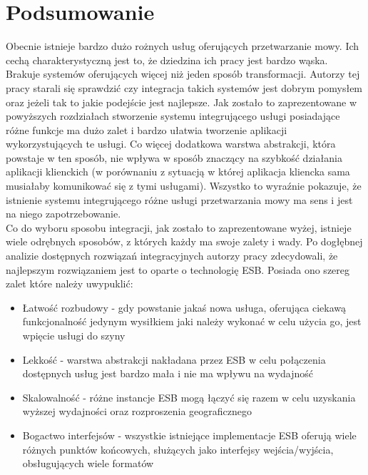 
\chapter{Podsumowanie} %



\ifpdf
    \graphicspath{{7/figures/PNG/}{7/figures/PDF/}{7/figures/}}
\else
    \graphicspath{{7/figures/EPS/}{7/figures/}}
\fi

Obecnie istnieje bardzo dużo rożnych usług oferujących przetwarzanie mowy. Ich cechą charakterystyczną jest to, że dziedzina ich pracy jest bardzo wąska. Brakuje systemów oferujących więcej niż jeden sposób transformacji. Autorzy tej pracy starali się sprawdzić czy integracja takich systemów jest dobrym pomysłem oraz jeżeli tak to jakie podejście jest najlepsze. Jak zostało to zaprezentowane w powyższych rozdziałach stworzenie systemu integrującego usługi posiadające różne funkcje ma dużo zalet i bardzo ułatwia tworzenie aplikacji wykorzystujących te usługi. Co więcej dodatkowa warstwa abstrakcji, która powstaje w ten sposób, nie wpływa w sposób znaczący na szybkość działania aplikacji klienckich (w porównaniu z sytuacją w której aplikacja kliencka sama musiałaby komunikować się z tymi usługami). Wszystko to wyraźnie pokazuje, że istnienie systemu integrującego różne usługi przetwarzania mowy ma sens i jest na niego zapotrzebowanie. \\
Co do wyboru sposobu integracji, jak zostało to zaprezentowane wyżej, istnieje wiele odrębnych sposobów, z których każdy ma swoje zalety i wady. Po dogłębnej analizie dostępnych rozwiązań integracyjnych autorzy pracy zdecydowali, że najlepszym rozwiązaniem jest to oparte o technologię ESB. Posiada ono szereg zalet które należy uwypuklić:
\begin{itemize}
	\item Łatwość rozbudowy - gdy powstanie jakaś nowa usługa, oferująca ciekawą funkcjonalność jedynym wysiłkiem jaki należy wykonać w celu użycia go, jest wpięcie usługi do szyny
	\item Lekkość - warstwa abstrakcji nakładana przez ESB w celu połączenia dostępnych usług jest bardzo mała i nie ma wpływu na wydajność
	\item Skalowalność - różne instancje ESB mogą łączyć się razem w celu uzyskania wyższej wydajności oraz rozproszenia geograficznego
	\item Bogactwo interfejsów - wszystkie istniejące implementacje ESB oferują wiele różnych punktów końcowych, służących jako interfejsy wejścia/wyjścia, obsługujących wiele formatów
\end{itemize}

